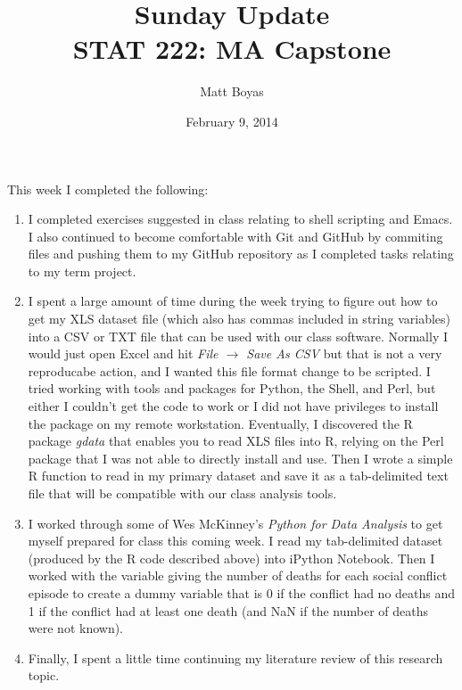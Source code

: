 \documentclass{article}
\begin{document}
\title{Sunday Update\\STAT 222: MA Capstone}
\author{Matt Boyas}

\date{February 9, 2014}
\maketitle
This week I completed the following:
\begin{enumerate}
\item I completed exercises suggested in class relating to shell scripting and Emacs.  I also continued to become comfortable with Git and GitHub by commiting files and pushing them to my GitHub repository as I completed tasks relating to my term project.

\item I spent a large amount of time during the week trying to figure out how to get my XLS dataset file (which also has commas included in string variables) into a CSV or TXT file that can be used with our class software.  Normally I would just open Excel and hit \textit{File $\to$ Save As CSV} but that is not a very reproducabe action, and I wanted this file format change to be scripted.  I tried working with tools and packages for Python, the Shell, and Perl, but either I couldn't get the code to work or I did not have privileges to install the package on my remote workstation.  Eventually, I discovered the R package \textit{gdata} that enables you to read XLS files into R, relying on the Perl package that I was not able to directly install and use.  Then I wrote a simple R function to read in my primary dataset and save it as a tab-delimited text file that will be compatible with our class analysis tools. 

\item I worked through some of Wes McKinney's \textit{Python for Data Analysis} to get myself prepared for class this coming week.  I read my tab-delimited dataset (produced by the R code described above) into iPython Notebook.  Then I worked with the variable giving the number of deaths for each social conflict episode to create a dummy variable that is 0 if the conflict had no deaths and 1 if the conflict had at least one death (and NaN if the number of deaths were not known).

\item Finally, I spent a little time continuing my literature review of this research topic.
\end{enumerate}
\end{document}
